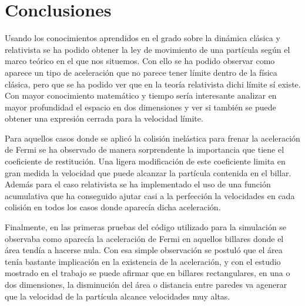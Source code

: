 \documentclass[11pt, spanish]{book}
\begin{document}
\chapter{Conclusiones}

Usando los conocimientos aprendidos en el grado sobre la dinámica clásica y relativista se ha podido obtener la ley de movimiento de una partícula según el marco teórico en el que nos situemos. Con ello se ha podido observar como aparece un tipo de aceleración que no parece tener límite dentro de la física clásica, pero que se ha podido ver que en la teoría relativista dichi límite sí existe. Con mayor conocimiento matemático y tiempo sería interesante analizar en mayor profundidad el espacio en dos dimensiones y ver si también se puede obtener una expresión cerrada para la velocidad límite. 

\vspace{3mm}

Para aquellos casos donde se aplicó la colisión inelástica para frenar la aceleración de Fermi se ha observado de manera sorprendente la importancia que tiene el coeficiente de restitución. Una ligera modificación de este coeficiente limita en gran medida la velocidad que puede alcanzar la partícula contenida en el billar. Además para el caso relativista se ha implementado el uso de una función acumulativa que ha conseguido ajutar casi a la perfección la velocidades en cada colisión en todos los casos donde aparecía dicha aceleración.

\vspace{3mm}

Finalmente, en las primeras pruebas del código utilizado para la simulación se observaba como aparecía la aceleración de Fermi en aquellos billares donde el área tendía a hacerse nula. Con esa simple observación se postuló que el área tenía bastante implicación en la existencia de la aceleración, y con el estudio mostrado en el trabajo se puede afirmar que en billares rectangulares, en una o dos dimensiones, la disminución del área o distancia entre paredes va agenerar que la velocidad de la partícula alcance velocidades muy altas.  
\end{document}
